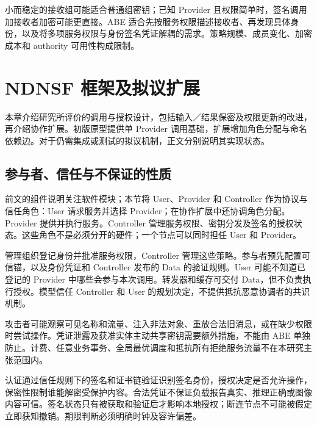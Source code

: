 小而稳定的接收组可能适合普通组密钥；已知 Provider 且权限简单时，签名调用加接收者加密可能更直接。ABE 适合先按服务权限描述接收者、再发现具体身份，以及将多项服务权限与身份签名凭证解耦的需求。策略规模、成员变化、加密成本和 authority 可用性构成限制。

\chapter{NDNSF 框架及拟议扩展}
本章介绍研究所评价的调用与授权设计，包括输入／结果保密及权限更新的改进，再介绍协作扩展。初版原型提供单 Provider 调用基础，扩展增加角色分配与命名依赖边。对于仍需集成或测试的拟议机制，正文分别说明其实现状态。



\section{参与者、信任与不保证的性质}
前文的组件说明关注软件模块；本节将 User、Provider 和 Controller 作为协议与信任角色：User 请求服务并选择 Provider；在协作扩展中还协调角色分配。Provider 提供并执行服务。Controller 管理服务权限、密钥分发及签名的授权状态。这些角色不是必须分开的硬件；一个节点可以同时担任 User 和 Provider。

管理组织登记身份并批准服务权限，Controller 管理这些策略。参与者预先配置可信锚，以及身份凭证和 Controller 发布的 Data 的验证规则。User 可能不知道已登记的 Provider 中哪些会参与本次调用。转发器和缓存可交付 Data，但不负责执行授权。模型信任 Controller 和 User 的规划决定，不提供抵抗恶意协调者的共识机制。

攻击者可能观察可见名称和流量、注入非法对象、重放合法旧消息，或在缺少权限时尝试操作。凭证泄露及获准实体主动共享密钥需要额外措施，不能由 ABE 单独防止。计费、任意业务事务、全局最优调度和抵抗所有拒绝服务流量不在本研究主张范围内。

认证通过信任规则下的签名和证书链验证识别签名身份，授权决定是否允许操作，保密性限制谁能解密受保护内容。合法凭证不保证负载报告真实、推理正确或图像内容可信。签名状态只有被获取和验证后才影响本地授权；断连节点不可能被假定立即获知撤销。期限判断必须明确时钟及容许偏差。

